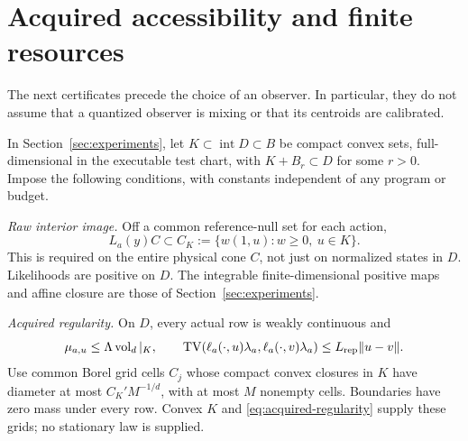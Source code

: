 \section{Acquired accessibility and finite resources}\label{sec:theorem}
The next certificates precede the choice of an observer. In particular, they do not assume that a quantized observer is mixing or that its centroids are calibrated.
\begin{definition}\label{def:class}
In Section~\ref{sec:experiments}, let $K\subset\operatorname{int}D\subset B$ be compact convex sets, full-dimensional in the executable test chart, with $K+B_r\subset D$ for some $r>0$. Impose the following conditions, with constants independent of any program or budget.

\emph{Raw interior image.} Off a common reference-null set for each action,
\begin{equation}\label{eq:raw-interior}
 L_a(y)C\subset C_K:=\{w(1,u):w\ge0,\ u\in K\}.
\end{equation}
This is required on the entire physical cone $C$, not just on normalized states in $D$. Likelihoods are positive on $D$. The integrable finite-dimensional positive maps and affine closure are those of Section~\ref{sec:experiments}.

\emph{Acquired regularity.} On $D$, every actual row is weakly continuous and
\begin{equation}\label{eq:acquired-regularity}
 \mu_{a,u}\le\Lambda\operatorname{vol}_d|_K,\qquad
 \operatorname{TV}(\ell_a(\cdot,u)\lambda_a,\ell_a(\cdot,v)\lambda_a)
       \le L_{\rm rep}\lVert u-v\rVert.
\end{equation}
Use common Borel grid cells $C_j$ whose compact convex closures in $K$ have diameter at most $C_K' M^{-1/d}$, with at most $M$ nonempty cells. Boundaries have zero mass under every row. Convex $K$ and \eqref{eq:acquired-regularity} supply these grids; no stationary law is supplied.


\end{definition}
